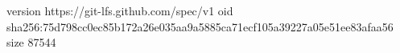 version https://git-lfs.github.com/spec/v1
oid sha256:75d798cc0ec85b172a26e035aa9a5885ca71ecf105a39227a05e51ee83afaa56
size 87544
